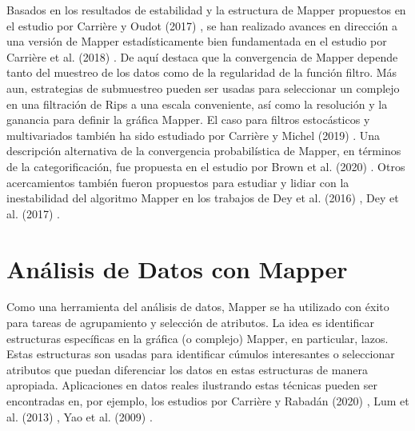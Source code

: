 Basados en los resultados de estabilidad y la estructura de Mapper propuestos en el estudio por
Carri\`ere y Oudot (2017) \cite{Carriere2017}, se han realizado avances en direcci\'on a
una versi\'on de Mapper estad\'isticamente bien fundamentada en el estudio por Carri\`ere et al. (2018)
\cite{Carriere2018}. De aqu\'i destaca que la convergencia de Mapper depende tanto del muestreo de los
datos como de la regularidad de la funci\'on filtro. M\'as aun, estrategias de submuestreo pueden ser
usadas para seleccionar un complejo en una filtraci\'on de Rips a una escala conveniente, as\'i como la
resoluci\'on y la ganancia para definir la gr\'afica Mapper. El caso para filtros estoc\'asticos y
multivariados tambi\'en ha sido estudiado por Carri\`ere y Michel (2019) \cite{Carriere2019}.
Una descripci\'on alternativa de la convergencia probabil\'istica de Mapper, en t\'erminos de la
categorificaci\'on, fue propuesta en el estudio por Brown et al. (2020) \cite{Brown2020}. Otros
acercamientos tambi\'en fueron propuestos para estudiar y lidiar con la inestabilidad del algoritmo
Mapper en los trabajos de Dey et al. (2016) \cite{Dey2016}, Dey et al. (2017) \cite{Dey2017}.

\section*{An\'alisis de Datos con Mapper}

Como una herramienta del an\'alisis de datos, Mapper se ha utilizado con \'exito para tareas de
agrupamiento y selecci\'on de atributos. La idea es identificar estructuras
espec\'ificas en la gr\'afica (o complejo) Mapper, en particular, lazos.
Estas estructuras son usadas para identificar
c\'umulos interesantes o seleccionar atributos que puedan diferenciar los datos en estas estructuras de
manera apropiada. Aplicaciones en datos reales ilustrando estas t\'ecnicas pueden ser encontradas en,
por ejemplo, los estudios por Carri\`ere y Rabad\'an (2020) \cite{Carriere2020}, Lum et al. (2013)
\cite{Lum2013}, Yao et al. (2009) \cite{Yao2009}.